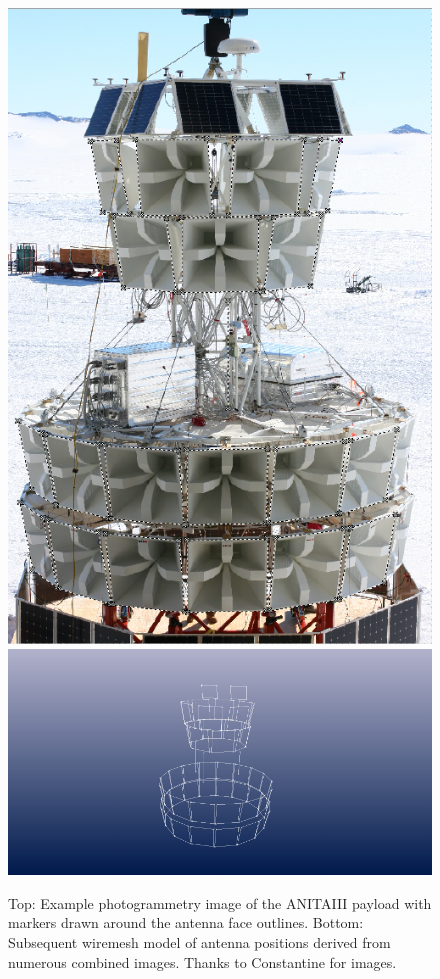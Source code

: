 	\begin{figure}
	\label{fig:photogram1}
		\centering
		\includegraphics[height=0.5\textheight]{figures/KBelovANITA-III_photogrammetry_update-3}
		\includegraphics[width=\textwidth]{figures/KBelovANITA-III_photogrammetry_update-4}
		\caption{Top: Example photogrammetry image of the ANITAIII payload with markers drawn around the antenna face outlines.  Bottom: Subsequent wiremesh model of antenna positions derived from numerous combined images.  Thanks to Constantine for images.}
	\end{figure}
	

